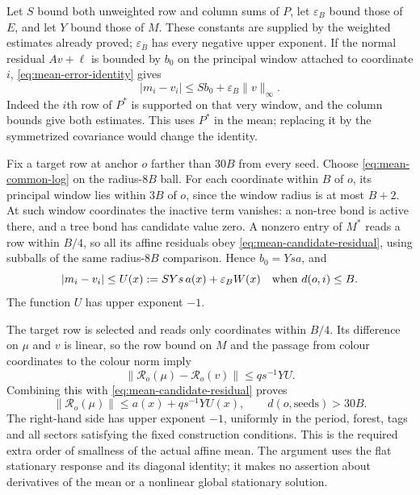 Let $S$ bound both unweighted row and column sums of $P$, let
$\varepsilon_B$ bound those of $E$, and let $Y$ bound those of $M$.
These constants are supplied by the weighted estimates already proved;
$\varepsilon_B$ has every negative upper exponent. If the normal
residual $Av+\ell$ is bounded by $b_0$ on the principal window
attached to coordinate $i$, \eqref{eq:mean-error-identity} gives
\begin{equation}\label{eq:mean-point}
 |m_i-v_i|\le S b_0+\varepsilon_B\|v\|_\infty.
\end{equation}
Indeed the $i$th row of $P^*$ is supported on that very window,
and the column bounds give both estimates. This uses $P^*$ in the
mean; replacing it by the symmetrized covariance would change the
identity.

Fix a target row at anchor $o$ farther than $30B$ from every seed.
Choose \eqref{eq:mean-common-log} on the radius-$8B$ ball. For each
coordinate within $B$ of $o$, its principal window lies within $3B$
of $o$, since the window radius is at most $B+2$. At such window
coordinates the inactive term vanishes: a non-tree bond is active
there, and a tree bond has candidate value zero. A nonzero entry
of $M^*$ reads a row within $B/4$, so all its affine residuals obey
\eqref{eq:mean-candidate-residual}, using subballs of the same
radius-$8B$ comparison. Hence $b_0=Ys a$, and
\[
 |m_i-v_i|\le U(x):=SYs\,a(x)+\varepsilon_BW(x)
 \quad\hbox{when }d(o,i)\le B.
\]
The function $U$ has upper exponent $-1$.

The target row is selected and reads only coordinates within $B/4$.
Its difference on $\mu$ and $v$ is linear, so the row bound on $M$
and the passage from colour coordinates to the colour norm imply
\[
 \|\mathcal R_o(\mu)-\mathcal R_o(v)\|
       \le q s^{-1}YU.
\]
Combining this with \eqref{eq:mean-candidate-residual} proves
\begin{equation}\label{eq:mean-remote-final}
 \|\mathcal R_o(\mu)\|\le a(x)+q s^{-1}YU(x),
 \qquad d(o,\text{seeds})>30B.
\end{equation}
The right-hand side has upper exponent $-1$, uniformly in the
period, forest, tags and all sectors satisfying the fixed construction
conditions. This is the required extra order of smallness of the
actual affine mean. The argument uses the flat stationary response
and its diagonal identity; it makes no assertion about derivatives
of the mean or a nonlinear global stationary solution.
